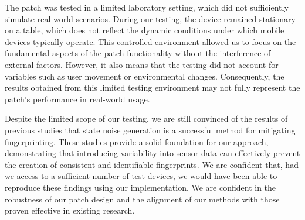 \documentclass[11pt,
  oneside,openany,    %
]{scrreprt}
\begin{document}
The patch was tested in a limited laboratory setting, which did not sufficiently simulate real-world scenarios.
During our testing, the device remained stationary on a table, which does not reflect the dynamic conditions under which mobile devices typically operate.
This controlled environment allowed us to focus on the fundamental aspects of the patch functionality without the interference of external factors. 
However, it also means that the testing did not account for variables such as user movement or environmental changes. 
Consequently, the results obtained from this limited testing environment may not fully represent the patch's performance in real-world usage.

Despite the limited scope of our testing, we are still convinced of the results of previous studies that state noise generation is a successful method for mitigating fingerprinting.
These studies provide a solid foundation for our approach, demonstrating that introducing variability into sensor data can effectively prevent the creation of consistent and identifiable fingerprints.
We are confident that, had we access to a sufficient number of test devices, we would have been able to reproduce these findings using our implementation.
We are confident in the robustness of our patch design and the alignment of our methods with those proven effective in existing research.
\end{document}

